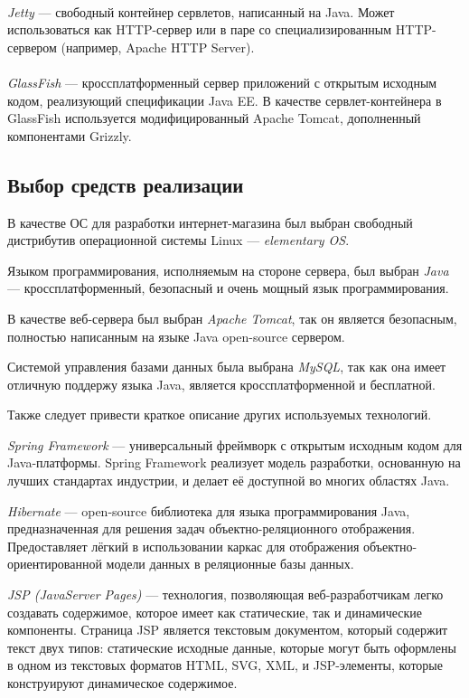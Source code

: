 \paragraph{}
\textit{Jetty} --- свободный контейнер сервлетов, написанный на Java. Может использоваться
как HTTP-сервер или в паре со специализированным HTTP-сервером (например, Apache HTTP Server).

\paragraph{}
\textit{GlassFish} --- кроссплатформенный сервер приложений с открытым исходным кодом,
реализующий спецификации Java EE. В качестве сервлет-контейнера в GlassFish используется
модифицированный Apache Tomcat, дополненный компонентами Grizzly.


\subsection{Выбор средств реализации}
\label{sub:choice_results}

В качестве ОС для разработки интернет-магазина был выбран свободный дистрибутив
операционной системы Linux --- \textit{elementary OS}.

Языком программирования, исполняемым на стороне сервера, был выбран \textit{Java} ---
кроссплатформенный, безопасный и очень мощный язык программирования.

В качестве веб-сервера был выбран \textit{Apache Tomcat}, так он является безопасным,
полностью написанным на языке Java open-source сервером.

Системой управления базами данных была выбрана \textit{MySQL}, так как она имеет отличную
поддержу языка Java, является кроссплатформенной и бесплатной.

Также следует привести краткое описание других используемых технологий.

\textit{Spring Framework} --- универсальный фреймворк с открытым исходным
кодом для Java-платформы. Spring Framework реализует модель разработки, основанную
на лучших стандартах индустрии, и делает её доступной во многих областях Java.

\textit{Hibernate} --- open-source библиотека для языка программирования Java,
предназначенная для решения задач объектно-реляционного отображения. Предоставляет
лёгкий в использовании каркас для отображения объектно-ориентированной модели данных
в реляционные базы данных.

\textit{JSP (JavaServer Pages)} --- технология, позволяющая веб-разработчикам
легко создавать содержимое, которое имеет как статические, так и динамические компоненты.
Страница JSP является текстовым документом, который содержит текст двух типов:
статические исходные данные, которые могут быть оформлены в одном из текстовых
форматов HTML, SVG, XML, и JSP-элементы, которые конструируют динамическое содержимое.

